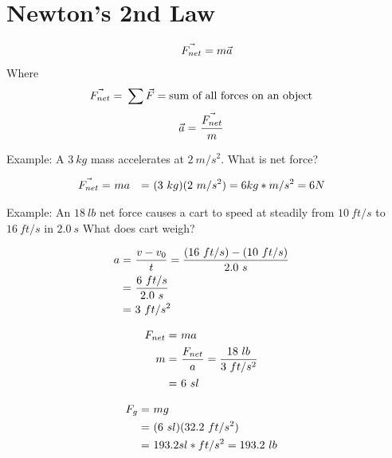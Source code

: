 \section{Newton's 2nd Law}
	\begin{align}
		\vec{F_{net}} = m\vec{a} \notag
	\end{align}
	Where
	\begin{align}
		\vec{F_{net}} = \ &\sum \vec{F} = \text{sum of all forces on an object}& \notag
	\end{align}
	\begin{align}
		\vec{a} = \ &\frac{\vec{F_{net}}}{m}& \notag
	\end{align}

	Example: A $3 \ kg$ mass accelerates at $2 \ m/s^{2}$. What is net force?

	\begin{align}
		\vec{F_{net}} = \ &ma& = \ &(3 \ kg)(2 \ m/s^{2}) = 6 kg*m/s^{2} = 6 N& \notag
	\end{align}

	Example: An $18 \ lb$ net force causes a cart to speed at steadily from $10 \ ft/s$ to $16 \ ft/s$ in $2.0 \ s$ What does cart weigh?

	\begin{align}
		a = \ &\frac{v - v_{0}}{t} = \frac{(16 \ ft/s) - (10 \ ft/s)}{2.0 \ s}& \notag \\
		= \ &\frac{6 \ ft/s}{2.0 \ s}& \notag \\
		= \ &3 \ ft/s^{2}& \notag
	\end{align}

	\begin{align}
		F_{net} = \ &ma& \notag \\
		m = \ &\frac{F_{net}}{a} = \frac{18 \ lb}{3 \ ft/s^{2}}& \notag \\
		= \ &6 \ sl& \notag
	\end{align}

	\begin{align}
		F_{g} = \ &mg& \notag \\
		= \ &(6 \ sl)(32.2 \ ft/s^{2})& \notag \\
		= \ &193.2 sl*ft/s^{2} = 193.2 \ lb& \notag
	\end{align}

